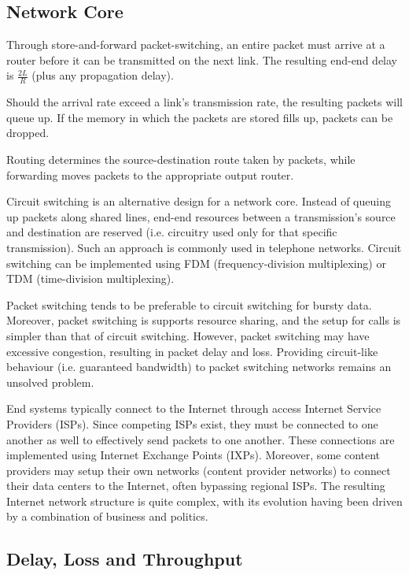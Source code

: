 \documentclass[12pt,titlepage]{article}
\begin{document}
    \subsection{Network Core}
      Through store-and-forward packet-switching, an entire packet must arrive at a router before it can be transmitted on the next link. The
      resulting end-end delay is $\frac{2L}{R}$ (plus any propagation delay).

      Should the arrival rate exceed a link's transmission rate, the resulting packets will queue up. If the memory in which the packets are
      stored fills up, packets can be dropped.

      Routing determines the source-destination route taken by packets, while forwarding moves packets to the appropriate output router.

      Circuit switching is an alternative design for a network core. Instead of queuing up packets along shared lines, end-end resources
      between a transmission's source and destination are reserved (i.e. circuitry used only for that specific transmission). Such an approach
      is commonly used in telephone networks. Circuit switching can be implemented using FDM (frequency-division multiplexing) or TDM
      (time-division multiplexing).

      Packet switching tends to be preferable to circuit switching for bursty data. Moreover, packet switching is supports resource sharing,
      and the setup for calls is simpler than that of circuit switching. However, packet switching may have excessive congestion, resulting
      in packet delay and loss. Providing circuit-like behaviour (i.e. guaranteed bandwidth) to packet switching networks remains an unsolved
      problem.

      End systems typically connect to the Internet through access Internet Service Providers (ISPs). Since competing ISPs exist, they must be
      connected to one another as well to effectively send packets to one another. These connections are implemented using Internet Exchange
      Points (IXPs). Moreover, some content providers may setup their own networks (content provider networks) to connect their data centers to the Internet,
      often bypassing regional ISPs. The resulting Internet network structure is quite complex, with its evolution having been driven by a
      combination of business and politics.

    \subsection{Delay, Loss and Throughput}
\end{document}
